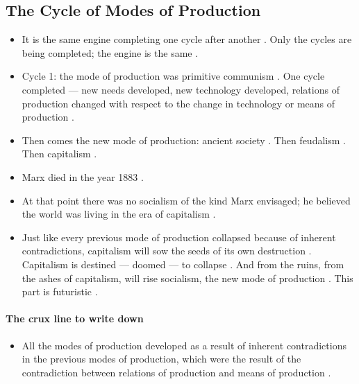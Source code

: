 \subsection{The Cycle of Modes of Production}
\begin{itemize}
    \item It is the same engine completing one cycle after another . Only the cycles are being completed; the engine is the same .
    \item Cycle 1: the mode of production was primitive communism . One cycle completed --- new needs developed, new technology developed, relations of production changed with respect to the change in technology or means of production .
    \item Then comes the new mode of production: ancient society . Then feudalism . Then capitalism .
\end{itemize}

\begin{DataFact}
\begin{itemize}
    \item Marx died in the year 1883 .
    \item At that point there was no socialism of the kind Marx envisaged; he believed the world was living in the era of capitalism .
\end{itemize}
\end{DataFact}

\begin{itemize}
    \item Just like every previous mode of production collapsed because of inherent contradictions, capitalism will sow the seeds of its own destruction . Capitalism is destined --- doomed --- to collapse . And from the ruins, from the ashes of capitalism, will rise socialism, the new mode of production . This part is futuristic .
\end{itemize}

\paragraph{The crux line to write down}
\begin{itemize}
    \item All the modes of production developed as a result of inherent contradictions in the previous modes of production, which were the result of the contradiction between relations of production and means of production .
\end{itemize}

